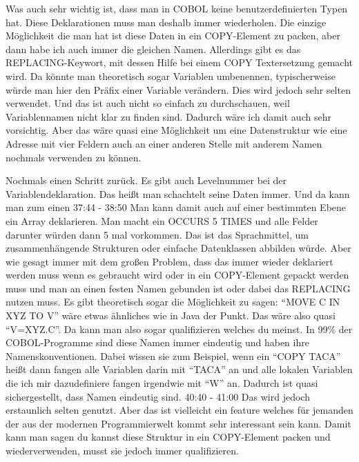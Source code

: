 {Was auch sehr wichtig ist, dass man in COBOL keine benutzerdefinierten Typen hat. Diese Deklarationen muss man deshalb immer wiederholen. Die einzige Möglichkeit die man hat ist diese Daten in ein COPY-Element zu packen, aber dann habe ich auch immer die gleichen Namen. Allerdings gibt es das REPLACING-Keywort, mit dessen Hilfe bei einem COPY Textersetzung gemacht wird. Da könnte man theoretisch sogar Variablen umbenennen, typischerweise würde man hier den Präfix einer Variable verändern. Dies wird jedoch sehr selten verwendet. Und das ist auch nicht so einfach zu durchschauen, weil Variablennamen nicht klar zu finden sind. Dadurch wäre ich damit auch sehr vorsichtig. Aber das wäre quasi eine Möglichkeit um eine Datenstruktur wie eine Adresse mit vier Feldern auch an einer anderen Stelle mit anderem Namen nochmals verwenden zu können.

Nochmals einen Schritt zurück. Es gibt auch Levelnummer bei der Variablendeklaration. Das heißt man schachtelt seine Daten immer. Und da kann man zum einen 37:44 - 38:50
Man kann damit auch auf einer bestimmten Ebene ein Array deklarieren. Man macht ein OCCURS 5 TIMES und alle Felder darunter würden dann 5 mal vorkommen. Das ist das Sprachmittel, um zusammenhängende Strukturen oder einfache Datenklassen abbilden würde. Aber wie gesagt immer mit dem großen Problem, dass das immer wieder deklariert werden muss wenn es gebraucht wird oder in ein COPY-Element gepackt werden muss und man an einen festen Namen gebunden ist oder dabei das REPLACING nutzen muss. Es gibt theoretisch sogar die Möglichkeit zu sagen: ``MOVE C IN XYZ TO V'' wäre etwas ähnliches wie in Java der Punkt. Das wäre also quasi ``V=XYZ.C''. Da kann man also sogar qualifizieren welches du meinst. In 99\% der COBOL-Programme sind diese Namen immer eindeutig und haben ihre Namenskonventionen. Dabei wissen sie zum Beispiel, wenn ein ``COPY TACA'' heißt dann fangen alle Variablen darin mit ``TACA'' an und alle lokalen Variablen die ich mir dazudefiniere fangen irgendwie mit ``W'' an. Dadurch ist quasi sichergestellt, dass Namen eindeutig sind.  40:40 - 41:00 
Das wird jedoch erstaunlich selten genutzt. Aber das ist vielleicht ein feature welches für jemanden der aus der modernen Programmierwelt kommt sehr interessant sein kann. Damit kann man sagen du kannst diese Struktur in ein COPY-Element packen und wiederverwenden, musst sie jedoch immer qualifizieren. }
